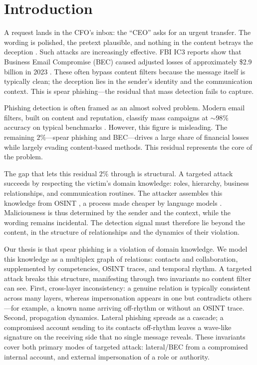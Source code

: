 \section{Introduction}
\label{sec:intro}

A request lands in the CFO's inbox: the ``CEO'' asks for an urgent transfer. The wording is polished, the pretext plausible, and nothing in the content betrays the deception \citep{butavicius2022why,sturman2025security}. Such attacks are increasingly effective. FBI IC3 reports show that Business Email Compromise (BEC) caused adjusted losses of approximately \$2.9 billion in 2023 \citep{fbi2024ic3}. These often bypass content filters because the message itself is typically clean; the deception lies in the sender's identity and the communication context. This is spear phishing---the residual that mass detection fails to capture.

Phishing detection is often framed as an almost solved problem. Modern email filters, built on content and
reputation, classify mass campaigns at $\sim$98\% accuracy on typical benchmarks
\citep{birthriya2025detection,tan2020graph}. However, this figure is misleading. The remaining $2\%$---spear phishing and BEC---drives a large share of financial losses
\citep{cidon2019high,ho2019detecting} while largely evading content-based methods. This residual represents
the core of the problem.

The gap that lets this residual $2\%$ through is structural. A targeted attack
succeeds by respecting the victim's domain knowledge: roles, hierarchy, business relationships, and communication routines. The attacker assembles this knowledge from OSINT
\citep{dewan2014analyzing,brown2025web}, a process made cheaper by language models \citep{bethany2024evaluating}.
Maliciousness is thus determined by the sender and the context, while the wording remains incidental. The detection signal must
therefore lie beyond the content, in the structure of relationships and the dynamics of their violation.

Our thesis is that spear phishing is a violation of domain knowledge. We model this knowledge as a multiplex graph of relations: contacts and collaboration, supplemented by competencies, OSINT traces, and temporal rhythm. A targeted attack breaks this structure, manifesting through two invariants no content filter can see. First, cross-layer inconsistency: a genuine relation is typically consistent across many layers, whereas impersonation appears in one but contradicts others---for example, a known name arriving off-rhythm or without an OSINT trace. Second, propagation dynamics. Lateral phishing spreads as a cascade; a compromised account sending to its contacts off-rhythm leaves a wave-like signature on the receiving side that no single message reveals. These invariants cover both primary modes of targeted attack: lateral/BEC from a compromised internal account, and external impersonation of a role or authority.

